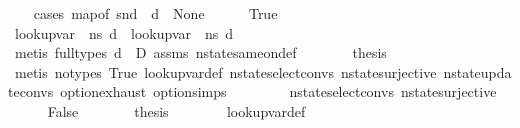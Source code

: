 \begin{isabellebody}
\ \ \isamarkupfalse%
\ {\isacharparenleft}{\kern0pt}cases\ {\isachardoublequoteopen}map{\isacharunderscore}{\kern0pt}of\ {\isacharparenleft}{\kern0pt}snd\ {\isasymLambda}{\isacharparenright}{\kern0pt}\ d\ {\isasymnoteq}\ None{\isachardoublequoteclose}{\isacharparenright}{\kern0pt}\isanewline
\ \ \ \ \isamarkupfalse%
\ True\isanewline
\ \ \ \ \isamarkupfalse%
\ {\isachardoublequoteopen}lookup{\isacharunderscore}{\kern0pt}var\ {\isasymLambda}\ ns{}\ d\ {\isacharequal}{\kern0pt}\ lookup{\isacharunderscore}{\kern0pt}var\ {\isasymLambda}\ ns{}\ d{\isachardoublequoteclose}\isanewline
\ \ \ \ \ \ \isamarkupfalse%
\ {\isacharparenleft}{\kern0pt}metis\ {\isacharparenleft}{\kern0pt}full{\isacharunderscore}{\kern0pt}types{\isacharparenright}{\kern0pt}\ {\isacartoucheopen}d\ {\isasymnotin}\ D{\isacartoucheclose}\ assms\ nstate{\isacharunderscore}{\kern0pt}same{\isacharunderscore}{\kern0pt}on{\isacharunderscore}{\kern0pt}def{\isacharparenright}{\kern0pt}\isanewline
\ \ \ \ \isamarkupfalse%
\ \isamarkupfalse%
\ {\isacharquery}{\kern0pt}thesis\isanewline
\ \ \ \ \ \ \isamarkupfalse%
\ {\isacharparenleft}{\kern0pt}metis\ {\isacharparenleft}{\kern0pt}no{\isacharunderscore}{\kern0pt}types{\isacharparenright}{\kern0pt}\ True\ lookup{\isacharunderscore}{\kern0pt}var{\isacharunderscore}{\kern0pt}def\ nstate{\isachardot}{\kern0pt}select{\isacharunderscore}{\kern0pt}convs{\isacharparenleft}{\kern0pt}{}{\isacharparenright}{\kern0pt}\ nstate{\isachardot}{\kern0pt}surjective\ nstate{\isachardot}{\kern0pt}update{\isacharunderscore}{\kern0pt}convs{\isacharparenleft}{\kern0pt}{}{\isacharparenright}{\kern0pt}\ option{\isachardot}{\kern0pt}exhaust\ option{\isachardot}{\kern0pt}simps{\isacharparenleft}{\kern0pt}{}{\isacharparenright}{\kern0pt}{\isacharparenright}{\kern0pt}\isanewline
\ \ \isamarkupfalse%
\isanewline
\ \ \ \ \isamarkupfalse%
\ nstate{\isachardot}{\kern0pt}select{\isacharunderscore}{\kern0pt}convs{\isacharparenleft}{\kern0pt}{}{\isacharparenright}{\kern0pt}\ nstate{\isachardot}{\kern0pt}surjective\isanewline
\ \ \ \ \isamarkupfalse%
\ False\isanewline
\ \ \ \ \isamarkupfalse%
\ \isamarkupfalse%
\ {\isacharquery}{\kern0pt}thesis\isanewline
\ \ \ \ \ \ \isamarkupfalse%
\ lookup{\isacharunderscore}{\kern0pt}var{\isacharunderscore}{\kern0pt}def\isanewline

\end{isabellebody}
